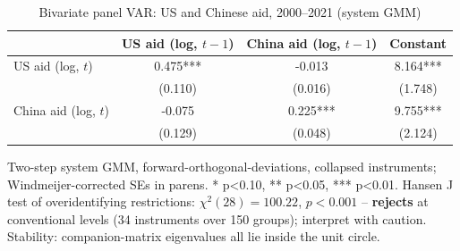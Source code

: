 \begin{table}[htbp]
\centering
\caption{Bivariate panel VAR: US and Chinese aid, 2000--2021 (system GMM)}
\label{tab:var}
\begin{tabular}{lccc}
\toprule
 & US aid (log, $t-1$) & China aid (log, $t-1$) & Constant \\
\midrule
US aid (log, $t$) & 0.475*** & -0.013 & 8.164*** \\
 & (0.110) & (0.016) & (1.748) \\[2pt]
China aid (log, $t$) & -0.075 & 0.225*** & 9.755*** \\
 & (0.129) & (0.048) & (2.124) \\[2pt]
\bottomrule
\end{tabular}
\begin{minipage}{0.9\textwidth}
\vspace{4pt}
\footnotesize Two-step system GMM, forward-orthogonal-deviations, collapsed
instruments; Windmeijer-corrected SEs in parens. * p<0.10, ** p<0.05, *** p<0.01.
Hansen J test of overidentifying restrictions: $\chi^2(28) = 100.22$, $p < 0.001$ --
\textbf{rejects} at conventional levels (34 instruments over 150 groups); interpret with caution.
Stability: companion-matrix eigenvalues all lie inside the unit circle.
\end{minipage}
\end{table}
